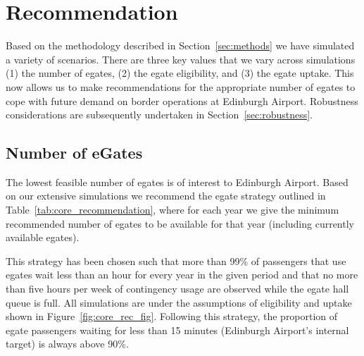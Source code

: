 \documentclass[10pt]{article}
\begin{document}
\section{Recommendation}

Based on the methodology described in Section~\ref{sec:methods} we have simulated a variety of scenarios. There are three key values that we vary across simulations (1) the number of \glspl{egate}, (2) the \gls{egate} eligibility, and (3) the \gls{egate} uptake. This now allows us to make recommendations for the appropriate number of \glspl{egate} to cope with future demand on border operations at Edinburgh Airport. Robustness considerations are subsequently undertaken in Section~\ref{sec:robustness}. 

\subsection{Number of eGates} \label{sec:rec_num_egates}

The lowest feasible number of \glspl{egate} is of interest to Edinburgh Airport. Based on our extensive simulations we recommend the \gls{egate} strategy outlined in Table~\ref{tab:core_recommendation}, where for each year we give the minimum recommended number of \glspl{egate} to be available for that year (including currently available \glspl{egate}). 



This strategy has been chosen such that more than 99\% of passengers that use \glspl{egate} wait less than an hour for every year in the given period and that no more than five hours per week of contingency usage are observed while the \gls{egate} hall queue is full. All simulations are under the assumptions of eligibility and uptake shown in Figure~\ref{fig:core_rec_fig}. Following this strategy, the proportion of \gls{egate} passengers waiting for less than 15 minutes (Edinburgh Airport's internal target) is always above 90\%. 
\end{document}
